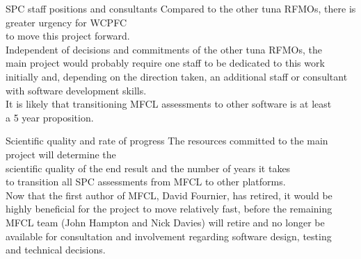 \documentclass[aspectratio=169,fleqn]{beamer}
\begin{document}

\begin{frame}{SPC staff positions and consultants}
  Compared to the other tuna RFMOs, there is greater urgency for WCPFC\\[0.5ex]
  to move this project forward.\\[4ex]

  Independent of decisions and commitments of the other tuna RFMOs, the\\[0.5ex]
  main project would probably require one staff to be dedicated to this
  work\\[0.5ex]
  initially and, depending on the direction taken, an additional staff or
  consultant\\[0.5ex]
  with software development skills.\\[4ex]

  It is likely that transitioning MFCL assessments to other software is at
  least\\[0.5ex]
  a 5 year proposition.\\[1ex]
\end{frame}


\begin{frame}{Scientific quality and rate of progress}
  The resources committed to the main project will determine the\\[0.5ex]
  scientific quality of the end result and the number of years it takes\\[0.5ex]
  to transition all SPC assessments from MFCL to other platforms.\\[5ex]
  Now that the first author of MFCL, David Fournier, has retired, it would
  be\\[0.5ex]
  highly beneficial for the project to move relatively fast, before the
  remaining\\[0.5ex]
  MFCL team (John Hampton and Nick Davies) will retire and no longer be\\[0.5ex]
  available for consultation and involvement regarding software design,
  testing\\[0.5ex]
  and technical decisions.
\end{frame}

\end{document}
